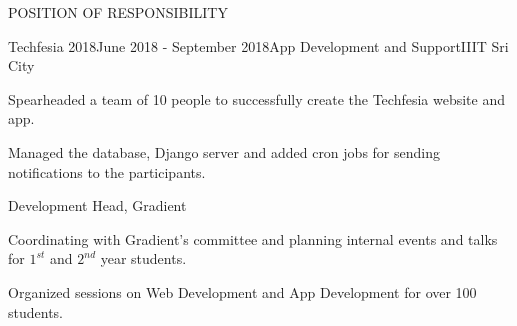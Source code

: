 \documentclass{resume} %
\begin{document}
\begin{rSection}{POSITION OF RESPONSIBILITY}

\begin{rSubsection}{Techfesia 2018}{June 2018 - September 2018}{App Development and Support}{IIIT Sri City}
\item Spearheaded a team of 10 people to successfully create the Techfesia website and app.
\item Managed the database, Django server and added cron jobs for sending notifications to the participants.
\end{rSubsection}


\begin{rSubsection}{Development Head, Gradient}{}{}{}
\item Coordinating with Gradient's committee and planning internal events and talks for $1^{st}$ and $2^{nd}$ year students.
\item Organized sessions on Web Development and App Development for over 100 students. 
\end{rSubsection}


\end{rSection}


\end{document}
